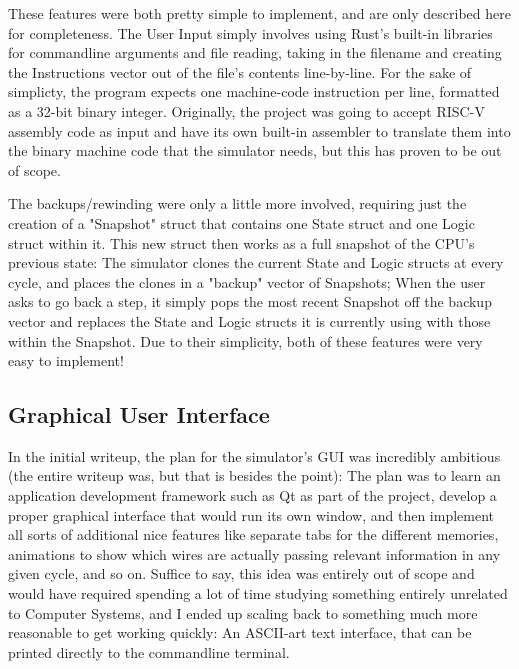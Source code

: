 \documentclass[12pt,twoside]{reedthesis}
\begin{document}
These features were both pretty simple to implement, and are only described here for completeness. The User Input simply involves using Rust's built-in libraries for commandline arguments and file reading, taking in the filename and creating the Instructions vector out of the file's contents line-by-line. For the sake of simplicty, the program expects one machine-code instruction per line, formatted as a 32-bit binary integer. Originally, the project was going to accept RISC-V assembly code as input and have its own built-in assembler to translate them into the binary machine code that the simulator needs, but this has proven to be out of scope.

The backups/rewinding were only a little more involved, requiring just the creation of a "Snapshot" struct that contains one State struct and one Logic struct within it. This new struct then works as a full snapshot of the CPU's previous state: The simulator clones the current State and Logic structs at every cycle, and places the clones in a "backup" vector of Snapshots; When the user asks to go back a step, it simply pops the most recent Snapshot off the backup vector and replaces the State and Logic structs it is currently using with those within the Snapshot. Due to their simplicity, both of these features were very easy to implement!

\subsection{Graphical User Interface}

In the initial writeup, the plan for the simulator's GUI was incredibly ambitious (the entire writeup was, but that is besides the point): The plan was to learn an application development framework such as Qt as part of the project, develop a proper graphical interface that would run its own window, and then implement all sorts of additional nice features like separate tabs for the different memories, animations to show which wires are actually passing relevant information in any given cycle, and so on. Suffice to say, this idea was entirely out of scope and would have required spending a lot of time studying something entirely unrelated to Computer Systems, and I ended up scaling back to something much more reasonable to get working quickly: An ASCII-art text interface, that can be printed directly to the commandline terminal.
\end{document}
